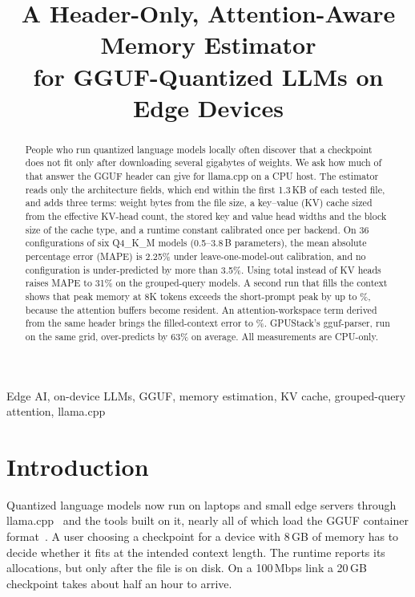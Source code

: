 \documentclass[conference]{IEEEtran}
\begin{document}
\title{A Header-Only, Attention-Aware Memory Estimator\\for GGUF-Quantized LLMs on Edge Devices}

\author{
}

\maketitle

\begin{abstract}
People who run quantized language models locally often discover that a checkpoint does not fit only after downloading several gigabytes of weights. We ask how much of that answer the GGUF header can give for llama.cpp on a CPU host. The estimator reads only the architecture fields, which end within the first 1.3\,KB of each tested file, and adds three terms: weight bytes from the file size, a key--value (KV) cache sized from the effective KV-head count, the stored key and value head widths and the block size of the cache type, and a runtime constant calibrated once per backend. On 36 configurations of six Q4\_K\_M models (0.5--3.8\,B parameters), the mean absolute percentage error (MAPE) is 2.25\% under leave-one-model-out calibration, and no configuration is under-predicted by more than 3.5\%. Using total instead of KV heads raises MAPE to 31\% on the grouped-query models. A second run that fills the context shows that peak memory at 8K tokens exceeds the short-prompt peak by up to \FilledMaxIncrease\%, because the attention buffers become resident. An attention-workspace term derived from the same header brings the filled-context error to \FilledMAPE\%. GPUStack's gguf-parser, run on the same grid, over-predicts by 63\% on average. All measurements are CPU-only.
\end{abstract}

\begin{IEEEkeywords}
Edge AI, on-device LLMs, GGUF, memory estimation, KV cache, grouped-query attention, llama.cpp
\end{IEEEkeywords}

\section{Introduction}
Quantized language models now run on laptops and small edge servers through llama.cpp~\cite{llamacpp} and the tools built on it, nearly all of which load the GGUF container format~\cite{ggufspec}. A user choosing a checkpoint for a device with 8\,GB of memory has to decide whether it fits at the intended context length. The runtime reports its allocations, but only after the file is on disk. On a 100\,Mbps link a 20\,GB checkpoint takes about half an hour to arrive.
\end{document}
